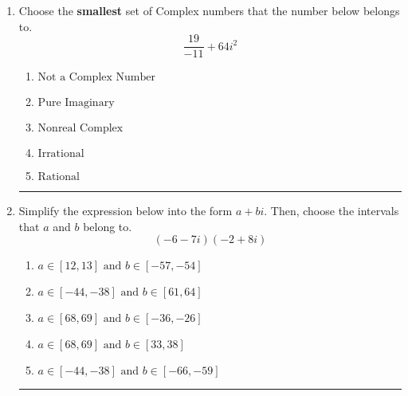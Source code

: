 \documentclass[14pt]{extbook}
\newcommand{\litem}[1]{\item#1\hspace*{-1cm}\rule{\textwidth}{0.4pt}}
\begin{document}
\begin{enumerate}
{\begin{enumerate}[label=\Alph*.]
\end{enumerate} }
\litem{
Choose the \textbf{smallest} set of Complex numbers that the number below belongs to.\[ \frac{19}{-11}+64i^2 \]\begin{enumerate}[label=\Alph*.]
\item \( \text{Not a Complex Number} \)
\item \( \text{Pure Imaginary} \)
\item \( \text{Nonreal Complex} \)
\item \( \text{Irrational} \)
\item \( \text{Rational} \)

\end{enumerate} }
\litem{
Simplify the expression below into the form $a+bi$. Then, choose the intervals that $a$ and $b$ belong to.\[ (-6 - 7 i)(-2 + 8 i) \]\begin{enumerate}[label=\Alph*.]
\item \( a \in [12, 13] \text{ and } b \in [-57, -54] \)
\item \( a \in [-44, -38] \text{ and } b \in [61, 64] \)
\item \( a \in [68, 69] \text{ and } b \in [-36, -26] \)
\item \( a \in [68, 69] \text{ and } b \in [33, 38] \)
\item \( a \in [-44, -38] \text{ and } b \in [-66, -59] \)

\end{enumerate} }
\end{enumerate}
\end{document}
